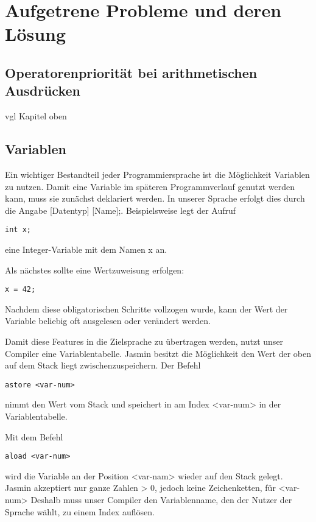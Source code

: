 
\section{Aufgetrene Probleme und deren Lösung}

\subsection{Operatorenpriorität bei arithmetischen Ausdrücken}
vgl Kapitel oben

\subsection{Variablen}
Ein wichtiger Bestandteil jeder Programmiersprache ist die Möglichkeit Variablen zu nutzen. Damit eine Variable im späteren Programmverlauf genutzt werden kann, muss sie zunächst deklariert werden. In unserer Sprache erfolgt dies durch die Angabe [Datentyp] [Name];. Beispielsweise legt der Aufruf

\begin{lstlisting}[frame=single]
int x;
\end{lstlisting}

eine Integer-Variable mit dem Namen x an.

Als nächstes sollte eine Wertzuweisung erfolgen:
\begin{lstlisting}[frame=single]
x = 42;
\end{lstlisting}

Nachdem diese obligatorischen Schritte vollzogen wurde, kann der Wert der Variable beliebig oft ausgelesen oder verändert werden.

Damit diese Features in die Zielsprache zu übertragen werden, nutzt unser Compiler eine Variablentabelle. Jasmin besitzt die Möglichkeit den Wert der oben auf dem Stack liegt zwischenzuspeichern. Der Befehl
\begin{lstlisting}[frame=single]
astore <var-num>
\end{lstlisting}
nimmt den Wert vom Stack und speichert in am Index <var-num> in der Variablentabelle.

Mit dem Befehl
\begin{lstlisting}[frame=single]
aload <var-num>
\end{lstlisting}
wird die Variable an der Position <var-nam> wieder auf den Stack gelegt. 
Jasmin akzeptiert nur ganze Zahlen > 0, jedoch keine Zeichenketten, für <var-num>
Deshalb muss unser Compiler den Variablenname, den der Nutzer der Sprache wählt, zu einem Index auflösen.


